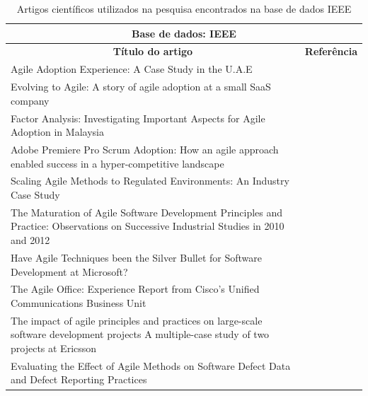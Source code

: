 \begin{table}[h]
	\centering
	\captionsetup{justification=centering,margin=1cm}
	\begin{tabularx}{\linewidth}{ | X | p{3cm} | } \hline \multicolumn{2}{|c|}{\textbf{Base de dados: IEEE}} \\ \hline
	\multicolumn{1}{|c|}{\textbf{Título do artigo}} & \multicolumn{1}{|c|}{\textbf{Referência}} \\ \hline
		Agile Adoption Experience: A Case Study in the U.A.E & \cite{Hajjdiab2011} \\ \hline
		Evolving to Agile: A story of agile adoption at a small SaaS company & \cite{Block2011} \\ \hline
		Factor Analysis: Investigating Important Aspects for Agile Adoption in Malaysia & \cite{Asnawi2012} \\ \hline
		Adobe Premiere Pro Scrum Adoption: How an agile approach enabled success in a hyper-competitive landscape & \cite{Adobe2012} \\ \hline
		Scaling Agile Methods to Regulated Environments: An Industry Case Study & \cite{Fitzgerald2013} \\ \hline
		The Maturation of Agile Software Development Principles and Practice: Observations on Successive Industrial Studies in 2010 and 2012 & \cite{Bustard2013} \\ \hline
		Have Agile Techniques been the Silver Bullet for Software Development at Microsoft? & \cite{Microsoft2013} \\ \hline
		The Agile Office: Experience Report from Cisco’s Unified Communications Business Unit & \cite{Cisco2011} \\ \hline
		The impact of agile principles and practices on large-scale software development projects A multiple-case study of two projects at Ericsson & \cite{Ericsson2013} \\ \hline
		Evaluating the Effect of Agile Methods on Software Defect Data and Defect Reporting Practices & \cite{Korhonen2010} \\ \hline
	\end{tabularx}
	\caption{Artigos científicos utilizados na pesquisa encontrados na base de dados IEEE}
	\label{tab:artigosIEEE}
\end{table}

